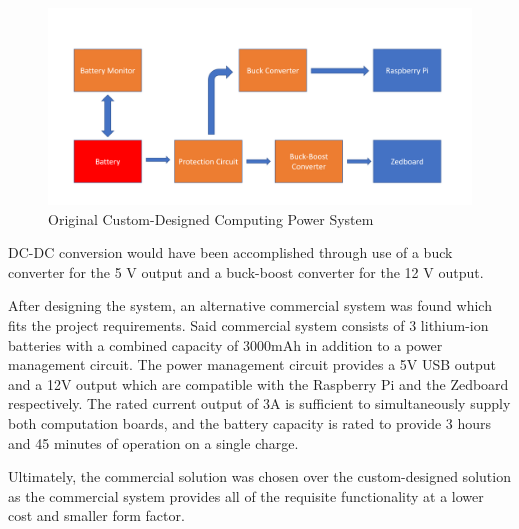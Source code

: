\begin{figure}[H]
\centering
\includegraphics[width=15cm]{img/Power_Diagram.png}
\caption{Original Custom-Designed Computing Power System}
\label{powerdiag}
\end{figure}

DC-DC conversion would have been accomplished through use of a buck converter for the 5 V output and a buck-boost converter for the 12 V output. 

After designing the system, an alternative commercial system was found which fits the project requirements. Said commercial system consists of 3 lithium-ion batteries with a combined capacity of 3000mAh in addition to a power management circuit. The power management circuit provides a 5V USB output and a 12V output which are compatible with the Raspberry Pi and the Zedboard respectively. The rated current output of 3A is sufficient to simultaneously supply both computation boards, and the battery capacity is rated to provide 3 hours and 45 minutes of operation on a single charge.

Ultimately, the commercial solution was chosen over the custom-designed solution as the commercial system provides all of the requisite functionality at a lower cost and smaller form factor.

